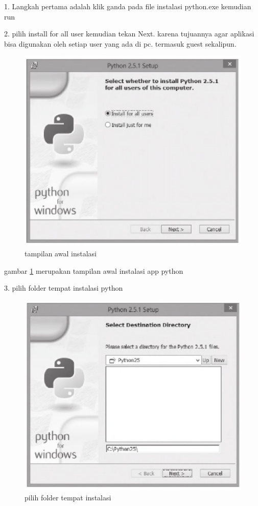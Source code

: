 	\begin {enumerate}
	1. Langkah pertama adalah klik ganda pada file instalasi python.exe
	kemudian run

	2. pilih install for all user kemudian tekan Next. karena tujuannya
	agar aplikasi bisa digunakan oleh setiap user yang ada di pc.
	termasuk guest sekalipun.
			
	\begin{figure}[ht]
	\centerline{\includegraphics[width=1\textwidth]{figures/awal.PNG}}
	\caption{tampilan awal instalasi}
	\label{awal}
	\end{figure}
	
	gambar \ref {awal} merupakan tampilan awal instalasi app python
	
	3. pilih folder tempat instalasi python
	
	\begin{figure}[ht]
	\centerline{\includegraphics[width=1\textwidth]{figures/folder.PNG}}
	\caption{pilih folder tempat instalasi}
	\label{folder}
	\end{figure}
	

\end{enumerate}
